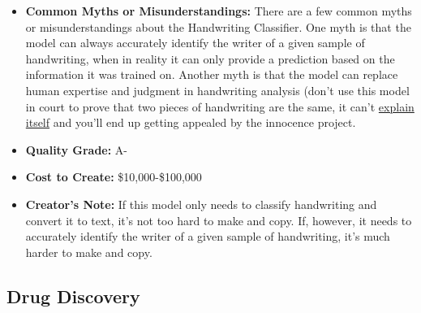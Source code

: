 \begin{itemize}
    \item \textbf{Common Myths or Misunderstandings:} There are a few common myths or misunderstandings about the Handwriting Classifier. One myth is that the model can always accurately identify the writer of a given sample of handwriting, when in reality it can only provide a prediction based on the information it was trained on. Another myth is that the model can replace human expertise and judgment in handwriting analysis (don't use this model in court to prove that two pieces of handwriting are the same, it can't \hyperref[sec:explain]{explain itself} and you'll end up getting appealed by the innocence project.
    \item \textbf{Quality Grade:} A-
    \item \textbf{Cost to Create:} \$10,000-\$100,000
    \item \textbf{Creator's Note:} If this model only needs to classify handwriting and convert it to text, it's not too hard to make and copy. If, however, it needs to accurately identify the writer of a given sample of handwriting, it's much harder to make and copy.
\end{itemize}

\subsection{Drug Discovery}

